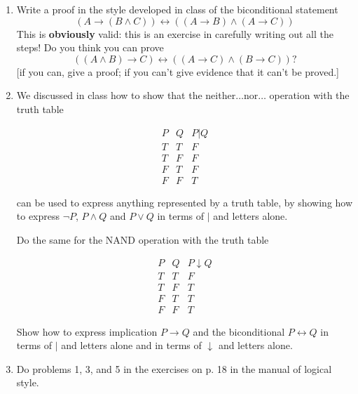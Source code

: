 \documentclass[12pt]{article}
\begin{document}
\begin{enumerate}
\item  Write a proof in the style developed in class of the biconditional statement $$(A \rightarrow (B \wedge C)) \leftrightarrow ((A \rightarrow B) \wedge (A \rightarrow C))$$  This is {\bf obviously} valid:  this is an exercise in carefully writing out all the steps!   Do you think you can prove $$((A \wedge B) \rightarrow C) \leftrightarrow ((A \rightarrow C) \wedge (B \rightarrow C))?$$ [if you can, give a proof;  if you can't give evidence that it can't be proved.]

\item We discussed in class how to show that the neither$\ldots$nor$\ldots$ operation with the truth table

$$\begin{array}{cc|c}

P  & Q & P|Q \\

\hline

T & T & F \\

T & F & F \\

F & T & F \\

F & F & T \end{array}$$

can be used to express anything represented by a truth table, by showing how to express $\neg P$, $P \wedge Q$ and $P \vee Q$ in terms of $|$ and letters alone.

Do the same for the NAND  operation with the truth table

$$\begin{array}{cc|c}

P  & Q & P\downarrow Q \\

\hline

T & T & F \\

T & F & T \\

F & T & T \\

F & F & T \end{array}$$

Show how to express  implication $P \rightarrow Q$ and the biconditional $P \leftrightarrow Q$ in terms of $|$ and letters alone and in terms of $\downarrow$ and letters alone.



\item  Do problems 1, 3, and 5 in the exercises on p. 18 in the manual of logical style.

\end{enumerate}
\end{document}

